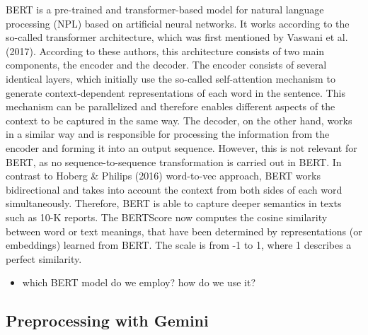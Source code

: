 \documentclass[
]{article}
\providecommand{\tightlist}{%
  \setlength{\itemsep}{0pt}\setlength{\parskip}{0pt}}\usepackage{longtable,booktabs,array}
\begin{document}
BERT is a pre-trained and transformer-based model for natural language
processing (NPL) based on artificial neural networks. It works according
to the so-called transformer architecture, which was first mentioned by
Vaswani et al. (2017). According to these authors, this architecture
consists of two main components, the encoder and the decoder. The
encoder consists of several identical layers, which initially use the
so-called self-attention mechanism to generate context-dependent
representations of each word in the sentence. This mechanism can be
parallelized and therefore enables different aspects of the context to
be captured in the same way. The decoder, on the other hand, works in a
similar way and is responsible for processing the information from the
encoder and forming it into an output sequence. However, this is not
relevant for BERT, as no sequence-to-sequence transformation is carried
out in BERT. In contrast to Hoberg \& Philips (2016) word-to-vec
approach, BERT works bidirectional and takes into account the context
from both sides of each word simultaneously. Therefore, BERT is able to
capture deeper semantics in texts such as 10-K reports. The BERTScore
now computes the cosine similarity between word or text meanings, that
have been determined by representations (or embeddings) learned from
BERT. The scale is from -1 to 1, where 1 describes a perfect similarity.

\begin{itemize}
\tightlist
\item
  which BERT model do we employ? how do we use it?
\end{itemize}

\subsection{Preprocessing with Gemini}\label{preprocessing-with-gemini}
\end{document}
